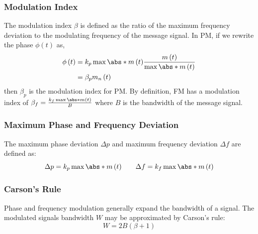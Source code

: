 \documentclass{article}
\begin{document}
\subsubsection{Modulation Index}
The modulation index \(\beta\) is defined as the ratio of the maximum
frequency deviation to the modulating frequency of the message signal.
In PM, if we rewrite the phase \(\phi\left( t \right)\) as,
\begin{align*}
    \phi\left( t \right) & = k_p \max{\abs*{m\left( t \right)}} \frac{m\left( t \right)}{\max{\abs*{m\left( t \right)}}} \\
                         & = \beta_p m_n\left( t \right)
\end{align*}
then \(\beta_p\) is the modulation index for PM.
By definition, FM has a modulation index of \(\beta_f = \frac{k_f \max{\abs*{m\left( t \right)}}}{B}\)
where \(B\) is the bandwidth of the message signal.
\subsubsection{Maximum Phase and Frequency Deviation}
The maximum phase deviation \(\Delta p\) and maximum frequency
deviation \(\Delta f\) are defined as:
\begin{equation*}
    \Delta p = k_p \max{\abs*{m\left( t \right)}} \qquad \Delta f = k_f \max{\abs*{m\left( t \right)}}
\end{equation*}
\subsubsection{Carson's Rule}
Phase and frequency modulation generally expand the bandwidth of a
signal. The modulated signals bandwidth \(W\) may be approximated by
Carson's rule:
\begin{equation*}
    W = 2B \left( \beta + 1 \right)
\end{equation*}
\end{document}
